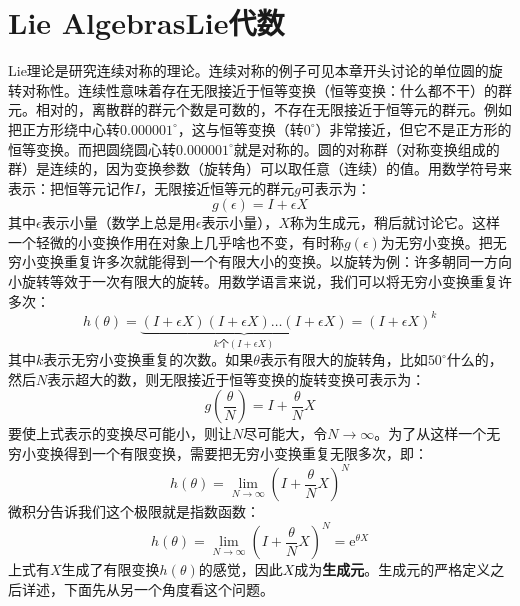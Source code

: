 \section[Lie代数]{Lie Algebras\quad Lie代数}
\label{sec3.4}
Lie理论是研究连续对称的理论。连续对称的例子可见本章开头讨论的单位圆的旋转对称性。连续性意味着存在无限接近于恒等变换（恒等变换：什么都不干）的群元。相对的，离散群的群元个数是可数的，不存在无限接近于恒等元的群元。例如把正方形绕中心转$0.000001^\circ$，这与恒等变换（转$0^\circ$）非常接近，但它不是正方形的恒等变换。而把圆绕圆心转$0.000001^\circ$就是对称的。圆的对称群（对称变换组成的群）是连续的，因为变换参数（旋转角）可以取任意（连续）的值。用数学符号来表示：把恒等元记作$I$，无限接近恒等元的群元$g$可表示为：
\begin{equation}
\label{equ3.48}
g(\epsilon) = I + \epsilon X
\end{equation}
其中$\epsilon$表示小量（数学上总是用$\epsilon$表示小量），$X$称为生成元，稍后就讨论它。这样一个轻微的小变换作用在对象上几乎啥也不变，有时称$g(\epsilon)$为无穷小变换。把无穷小变换重复许多次就能得到一个有限大小的变换。以旋转为例：许多朝同一方向小旋转等效于一次有限大的旋转。用数学语言来说，我们可以将无穷小变换重复许多次：
\begin{equation}
\label{equ3.49}
h(\theta) = \underbrace{(I + \epsilon X)(I + \epsilon X) \dots (I + \epsilon X)}_{k\text{个}(I + \epsilon X)} = (I + \epsilon X)^k
\end{equation}
其中$k$表示无穷小变换重复的次数。如果$\theta$表示有限大的旋转角，比如$50^\circ$什么的，然后$N$表示超大的数，则无限接近于恒等变换的旋转变换可表示为：
\begin{equation}
\label{equ3.50}
g(\frac{\theta}{N}) = I + \frac{\theta}{N} X
\end{equation}
要使上式表示的变换尽可能小，则让$N$尽可能大，令$N \rightarrow \infty$。为了从这样一个无穷小变换得到一个有限变换，需要把无穷小变换重复无限多次，即：
\begin{equation}
\label{equ3.51}
h(\theta) = \lim_{N \rightarrow \infty} \left( I + \frac{\theta}{N}X \right)^N
\end{equation}
微积分告诉我们这个极限就是指数函数：
\begin{equation}
\label{equ3.52}
h(\theta) = \lim_{N \rightarrow \infty} \left( I + \frac{\theta}{N}X \right)^N = \mathrm{e}^{\theta X}
\end{equation}
上式有$X$生成了有限变换$h(\theta)$的感觉，因此$X$成为{\bfseries 生成元}。生成元的严格定义之后详述，下面先从另一个角度看这个问题。

